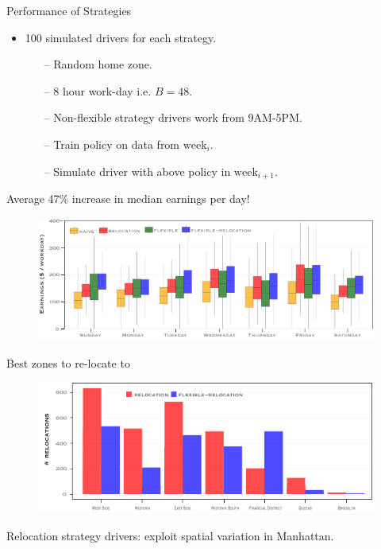 \begin{frame}{Performance of Strategies}
\begin{itemize}
	\item 100 simulated drivers for each strategy.
	\begin{itemize}
		\item[--] Random home zone.
		\item[--] 8 hour work-day i.e. $B=48$.
		\item[--] Non-flexible strategy drivers work from 9AM-5PM.
		\item[--] Train policy on data from $\mathrm{week}_i$.
		\item[--] Simulate driver with above policy in $\mathrm{week}_{i+1}$.
	\end{itemize}
\end{itemize}
\pause
\alert{Average 47\% increase in median earnings per day!}
\begin{figure}
	\centering
	\includegraphics[width=0.85\paperwidth]{figures/daily_simulated_earnings.pdf}
\end{figure}
\end{frame}

\begin{frame}{Best zones to re-locate to}
\begin{figure}
	\centering
	\includegraphics[width=0.85\paperwidth]{figures/relocation_endzones.pdf}
\end{figure}
\alert{Relocation strategy drivers: exploit spatial variation in Manhattan.}
\end{frame}

